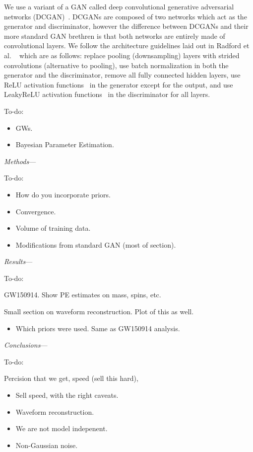 \documentclass[%
showpacs,
 amsmath,amssymb,
 aps,
 twocolumn,
 prl,
 reprint,
floatfix,
]{revtex4-1}
\begin{document}
We use a variant of a GAN called deep convolutional generative adversarial
networks (DCGAN)~\cite{1511.06434}. DCGANs are composed of two networks which act as
the generator and discriminator, however the difference between DCGANs and their more standard
GAN brethren is that both networks are entirely made of
convolutional layers. We follow the architecture guidelines laid out in Radford et al.
~\cite{1511.06434} which are as follows: replace pooling (downsampling) layers with strided
convolutions (alternative to pooling),
use batch normalization in both the generator and the discriminator, remove all fully
connected hidden layers, use ReLU activation functions~\cite{Nair:2010:RLU:3104322.3104425}
in the generator except for the output,
and use LeakyReLU activation functions~\cite{Maas2013RectifierNI} in the discriminator for all layers.

To-do:

\begin{itemize}
\item GWs.
\item Bayesian Parameter Estimation.
\end{itemize}

\textit{Methods}---


To-do:

\begin{itemize}
\item How do you incorporate priors.
\item Convergence.
\item Volume of training data.
\item Modifications from standard GAN (most of section).
\end{itemize}

\textit{Results}---


To-do:

GW150914. Show PE estimates on mass, spins, etc.

Small section on waveform reconstruction. Plot of this as well.  

\begin{itemize}
\item Which priors were used. Same as GW150914 analysis.
\end{itemize}
\textit{Conclusions}---

To-do:

Percision that we get, speed (sell this hard), 

\begin{itemize}
\item Sell speed, with the right caveats.
\item Waveform reconstruction.
\item We are not model indepenent.
\item Non-Gaussian noise.
\end{itemize}
\end{document}
